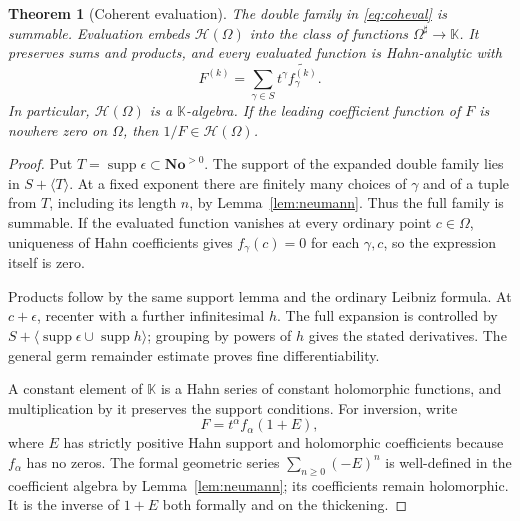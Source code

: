 \documentclass[11pt,a4paper]{article}
\numberwithin{equation}{section}
\newtheorem{theorem}{Theorem}[section]
\theoremstyle{definition}
\theoremstyle{remark}
\newcommand{\No}{\mathbf{No}}
\newcommand{\K}{\mathbb K}
\newcommand{\HH}{\mathscr H}
\newcommand{\supp}{\operatorname{supp}}
\begin{document}
\begin{theorem}[Coherent evaluation]
\label{thm:coherence}
The double family in \eqref{eq:coheval} is summable. Evaluation embeds $\HH(\Omega)$ into the class of functions $\Omega^\sharp\to\K$. It preserves sums and products, and every evaluated function is Hahn-analytic with
\[
 F^{(k)}=\sum_{\gamma\in S}t^\gamma\widetilde{f_\gamma^{(k)}}.
\]
In particular, $\HH(\Omega)$ is a $\K$-algebra. If the leading coefficient function of $F$ is nowhere zero on $\Omega$, then $1/F\in\HH(\Omega)$.
\end{theorem}
\begin{proof}
Put $T=\supp\epsilon\subset\No^{>0}$. The support of the expanded double family lies in $S+\langle T\rangle$. At a fixed exponent there are finitely many choices of $\gamma$ and of a tuple from $T$, including its length $n$, by Lemma~\ref{lem:neumann}. Thus the full family is summable. If the evaluated function vanishes at every ordinary point $c\in\Omega$, uniqueness of Hahn coefficients gives $f_\gamma(c)=0$ for each $\gamma,c$, so the expression itself is zero.

Products follow by the same support lemma and the ordinary Leibniz formula. At $c+\epsilon$, recenter with a further infinitesimal $h$. The full expansion is controlled by
$S+\langle\supp\epsilon\cup\supp h\rangle$; grouping by powers of $h$ gives the stated derivatives. The general germ remainder estimate proves fine differentiability.

A constant element of $\K$ is a Hahn series of constant holomorphic functions, and multiplication by it preserves the support conditions. For inversion, write
\[
 F=t^\alpha f_\alpha(1+E),
\]
where $E$ has strictly positive Hahn support and holomorphic coefficients because $f_\alpha$ has no zeros. The formal geometric series $\sum_{n\geq0}(-E)^n$ is well-defined in the coefficient algebra by Lemma~\ref{lem:neumann}; its coefficients remain holomorphic. It is the inverse of $1+E$ both formally and on the thickening.
\end{proof}
\end{document}
